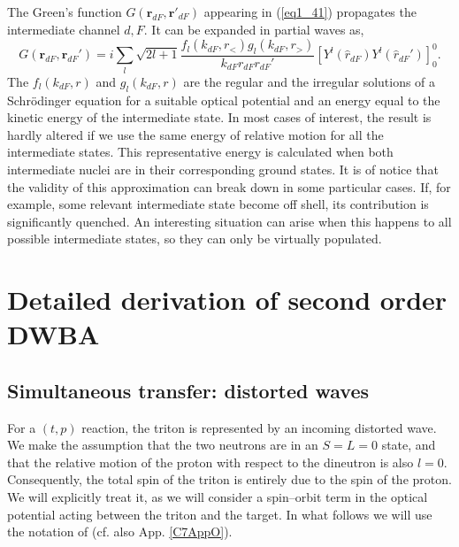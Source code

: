 The Green's function $G(\mathbf{r}_{dF},\mathbf{r}'_{dF})$ appearing in (\ref{eq1_41}) propagates the intermediate channel $d,F$. It  can be expanded in partial waves as,
\begin{equation}\label{eq7_1_12}
G(\mathbf{r}_{dF},\mathbf{r}_{dF}')=i\sum_{l}\sqrt{2l+1}
\frac{f_{l}(k_{dF},r_<)g_{l}(k_{dF},r_>)}{k_{dF}r_{dF}r_{dF}'}
\left[  Y^{l} (\hat r_{dF}) Y^{l} (\hat r_{dF}')\right]_0^0.
\end{equation}
The $f_{l}(k_{dF},r)$ and $g_l(k_{dF},r)$ are the regular and the irregular solutions of a Schr\"{o}dinger equation for  a suitable optical potential and an energy equal to the kinetic energy of the intermediate state. In most cases of interest, the result is hardly altered if we use the same energy of  relative motion for all the intermediate states. This representative energy is calculated when both intermediate nuclei are in their corresponding ground states. It is of notice that the validity of this approximation can break down in some particular cases. If, for example, some relevant intermediate state become off shell, its contribution is significantly quenched. An interesting situation can arise when this happens to all possible intermediate states, so they can only be virtually populated.
\section{Detailed derivation of second order DWBA}\label{C7S2}
\subsection{Simultaneous transfer: distorted waves}
For a $(t,p)$ reaction, the triton is represented by an incoming distorted wave. We make the assumption that the two neutrons are in an $S=L=0$ state, and that the relative motion of the proton with respect to the dineutron is also $l=0$. Consequently, the total spin of the triton   is entirely due to the spin of the proton. We will explicitly treat it, as we will consider a spin--orbit term in the optical potential acting between the triton and the target. In what follows we will use the notation of \cite{Bayman:71} (cf. also App. \ref{C7AppO}).



